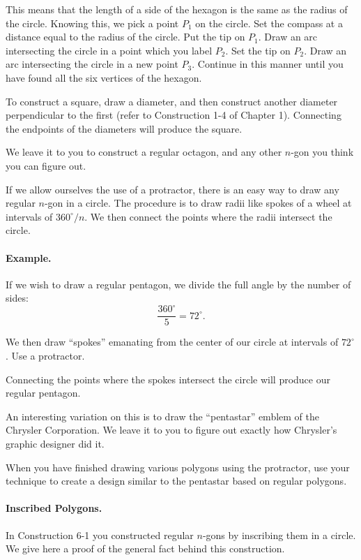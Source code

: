 \documentclass[12pt]{book} %
\begin{document}
This means that the length of a side of the hexagon is the same as the radius of the circle. Knowing this, we pick a point $P_1$ on the circle. Set the compass at a distance equal to the radius of the circle. Put the tip on $P_1$. Draw an arc intersecting the circle in a point which you label $P_2$. Set the tip on $P_2$. Draw an arc intersecting the circle in a new point $P_3$. Continue in this manner until you have found all the six vertices of the hexagon.


To construct a square, draw a diameter, and then construct another diameter perpendicular to the first (refer to Construction 1-4 of Chapter 1). Connecting the endpoints of the diameters will produce the square.

We leave it to you to construct a regular octagon, and any other $n$-gon you think you can figure out.

If we allow ourselves the use of a protractor, there is an easy way to draw any regular $n$-gon in a circle. The procedure is to draw radii like spokes of a wheel at intervals of $360^\circ/n$. We then connect the points where the radii intersect the circle.

\paragraph{Example.}
If we wish to draw a regular pentagon, we divide the full angle by the number of sides:
\[
\frac{360^\circ}{5}=72^\circ.
\]

We then draw ``spokes'' emanating from the center of our circle at intervals of $72^\circ$. Use a protractor.


Connecting the points where the spokes intersect the circle will produce our regular pentagon.

An interesting variation on this is to draw the ``pentastar'' emblem of the Chrysler Corporation. We leave it to you to figure out exactly how Chrysler's graphic designer did it.


When you have finished drawing various polygons using the protractor, use your technique to create a design similar to the pentastar based on regular polygons.

\paragraph{Inscribed Polygons.}
In Construction 6-1 you constructed regular $n$-gons by inscribing them in a circle. We give here a proof of the general fact behind this construction.
\end{document}
